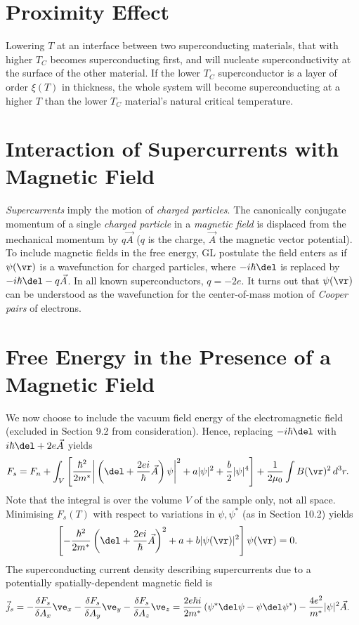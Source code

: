 \documentclass[qo.tex]{subfiles}
\begin{document}
\section{Proximity Effect}
Lowering $T$ at an interface between two superconducting materials, that with higher $T_C$ becomes superconducting first, and will nucleate superconductivity at the surface of the other material. 
If the lower $T_C$ superconductor is a layer of order $\xi(T)$ in thickness, the whole system will become superconducting at a higher $T$ than the lower $T_C$ material's natural critical temperature.

\section{Interaction of Supercurrents with Magnetic Field}
\emph{Supercurrents} imply the motion of \emph{charged particles}.
The canonically conjugate momentum of a single \emph{charged particle} in a \emph{magnetic field} is displaced from the mechanical momentum by $q\vec{A}$ ($q$ is the charge, $\vec{A}$ the magnetic vector potential).
To include magnetic fields in the free energy, GL postulate the field enters as if $\psi(\vr)$ is a wavefunction for charged particles, where $-i\hbar\del$ is replaced by $-i\hbar\del-q\vec{A}$.
In all known superconductors, $q=-2e$.
It turns out that $\psi(\vr)$ can be understood as the wavefunction for the center-of-mass motion of \emph{Cooper pairs} of electrons. 

\section{Free Energy in the Presence of a Magnetic Field}
We now choose to include the vacuum field energy of the electromagnetic field (excluded in Section 9.2 from consideration).
Hence, replacing $-i\hbar\del$ with $i\hbar\del+2e\vec{A}$ yields
\begin{align}
    F_s &= F_n + \int_V \left[\frac{\hbar^2}{2m^*}\bigg|\left(\del+\frac{2ei}{\hbar}\vec{A}\right)\psi\bigg|^2 + a|\psi|^2 + \frac{b}{2}|\psi|^4\right] + \frac{1}{2\mu_0}\int B(\vr)^2\,d^3r.
\end{align}
Note that the integral is over the volume $V$ of the sample only, not all space. 
Minimising $F_s(T)$ with respect to variations in $\psi,\psi^*$ (as in Section 10.2) yields
\begin{align}
    \left[-\frac{\hbar^2}{2m^*}\left(\del+\frac{2ei}{\hbar}\vec{A}\right)^2+a+b|\psi(\vr)|^2\right]\psi(\vr) &= 0.
\end{align}
The superconducting current density describing supercurrents due to a potentially spatially-dependent magnetic field is
\begin{align}
    \vec{j}_s &= -\frac{\delta F_s}{\delta A_x}\ve_x - \frac{\delta F_s}{\delta A_y}\ve_y - \frac{\delta F_s}{\delta A_z}\ve_z = \frac{2e\hbar i}{2m^*} \left(\psi^*\del\psi-\psi\del\psi^*\right) - \frac{4e^2}{m^*}|\psi|^2\vec{A}.
\end{align}
\end{document}
